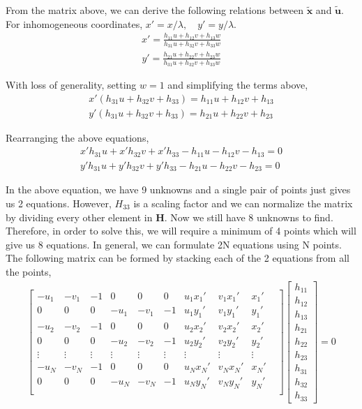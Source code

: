 \documentclass[a4paper]{article}
\begin{document}
From the matrix above, we can derive the following relations between $\mathbf{\tilde{x}}$ and $\mathbf{\tilde{u}}$. For inhomogeneous coordinates, $x'=x/\lambda, \quad y'=y/\lambda$.
\begin{gather}
    x' = \frac{h_{11}u + h_{12}v + h_{13}w}{h_{31}u + h_{32}v + h_{33}w}
\end{gather}
\begin{gather}
    y' = \frac{h_{21}u + h_{22}v + h_{23}w}{h_{31}u + h_{32}v + h_{33}w}
\end{gather}

With loss of generality, setting $w=1$ and simplifying the terms above,
\begin{gather}
    x'(h_{31}u + h_{32}v + h_{33}) = h_{11}u + h_{12}v + h_{13}
    \\
    y'(h_{31}u + h_{32}v + h_{33}) = h_{21}u + h_{22}v + h_{23}
\end{gather}

Rearranging the above equations,
\begin{gather}
    x'h_{31}u + x'h_{32}v + x'h_{33} - h_{11}u - h_{12}v - h_{13} = 0
    \\
    y'h_{31}u + y'h_{32}v + y'h_{33} - h_{21}u - h_{22}v - h_{23} = 0
\end{gather}

In the above equation, we have 9 unknowns and a single pair of points just gives us 2 equations. However, $H_{33}$ is a scaling factor and we can normalize the matrix by dividing every other element in $\mathbf{H}$. Now we still have 8 unknowns to find. Therefore, in order to solve this, we will require a minimum of 4 points which will give us 8 equations. In general, we can formulate 2N equations using N points. The following matrix can be formed by stacking each of the 2 equations from all the points,
\begin{gather}
\begin{bmatrix}
-u_1 & -v_1 & -1 & 0 & 0 & 0 & u_1x_1' & v_1x_1' & x_1' \\
0 & 0 & 0 & -u_1 & -v_1 & -1 & u_1y_1' & v_1y_1' & y_1' \\
-u_2 & -v_2 & -1 & 0 & 0 & 0 & u_2x_2' & v_2x_2' & x_2' \\
0 & 0 & 0 & -u_2 & -v_2 & -1 & u_2y_2' & v_2y_2' & y_2' \\
\vdots & \vdots & \vdots & \vdots & \vdots & \vdots & \vdots & \vdots & \vdots & \\
-u_N & -v_N & -1 & 0 & 0 & 0 & u_Nx_N' & v_Nx_N' & x_N' \\
0 & 0 & 0 & -u_N & -v_N & -1 & u_Ny_N' & v_Ny_N' & y_N' \\
\end{bmatrix}
\begin{bmatrix}h_{11} \\ h_{12} \\ h_{13} \\ h_{21} \\ h_{22} \\ h_{23} \\ h_{31} \\ h_{32} \\h_{33} \end{bmatrix} = 0
\end{gather}
\end{document}
